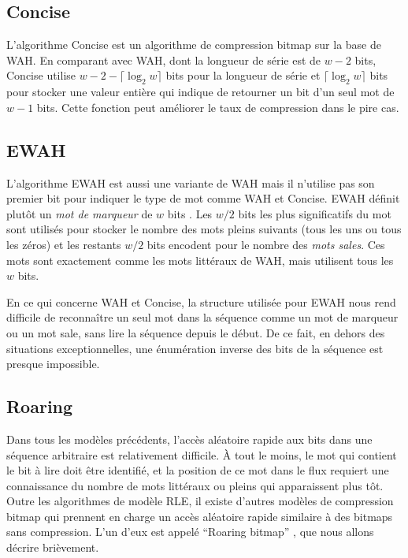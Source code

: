 \subsection{Concise}

L'algorithme Concise \citep{colantonio2010} est un algorithme de compression bitmap sur la base de WAH. En comparant avec WAH, dont la longueur de série est de $w-2$ bits, Concise utilise $w - 2 - \lceil \log_2 w \rceil$ bits pour la longueur de série et $\lceil \log_2 w \rceil$ bits pour stocker une valeur entière qui indique de retourner un bit d'un seul mot de $w-1$ bits. Cette fonction peut améliorer le taux de compression dans le pire cas.

\subsection{EWAH}

L'algorithme EWAH \citep{lemire2010} est aussi une variante de WAH mais il n'utilise pas son premier bit pour indiquer le type de mot comme WAH et Concise. EWAH définit plutôt un \emph{mot de marqueur} de $w$ bits . Les $w/2$ bits les plus significatifs du mot sont utilisés pour stocker le nombre des mots pleins suivants (tous les uns ou tous les zéros) et les restants $w/2$ bits encodent pour le nombre des \emph{mots sales}. Ces mots sont exactement comme les mots littéraux de WAH, mais utilisent tous les $w$ bits.

En ce qui concerne WAH et Concise, la structure utilisée pour EWAH nous rend difficile de reconnaître un seul mot dans la séquence comme un mot de marqueur ou un mot sale, sans lire la séquence depuis le début. De ce fait, en dehors des situations exceptionnelles, une énumération inverse des bits de la séquence est presque impossible.

\subsection{Roaring}

Dans tous les modèles précédents, l'accès aléatoire rapide aux bits dans une séquence arbitraire est relativement difficile. À tout le moins, le mot qui contient le bit à lire doit être identifié, et la position de ce mot dans le flux requiert une connaissance du nombre de mots littéraux ou pleins qui apparaissent plus tôt. Outre les algorithmes de modèle RLE, il existe d'autres modèles de compression bitmap qui prennent en charge un accès aléatoire rapide similaire à des bitmaps sans compression. L'un d'eux est appelé ``Roaring bitmap'' \citep{lemire2015}, que nous allons décrire brièvement.

